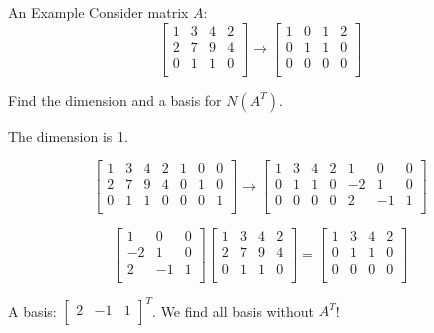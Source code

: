 \documentclass{beamer}
\begin{document}
\begin{frame}{An Example}
Consider matrix $A$:
\begin{equation*}
    \left[ \begin{matrix}
        1&		3&		4&		2\\
        2&		7&		9&		4\\
        0&		1&		1&		0\\
    \end{matrix} \right] \rightarrow \left[ \begin{matrix}
        1&		0&		1&		2\\
        0&		1&		1&		0\\
        0&		0&		0&		0\\
    \end{matrix} \right]
\end{equation*}

Find the dimension and a basis for $N(A^T)$.

\vspace{3pt}
The dimension is 1.

\begin{equation*}
    \left[ \begin{matrix}
        1&		3&		4&		2&		1&		0&		0\\
        2&		7&		9&		4&		0&		1&		0\\
        0&		1&		1&		0&		0&		0&		1\\
    \end{matrix} \right] \rightarrow \left[ \begin{matrix}
        1&		3&		4&		2&		1&		0&		0\\
        0&		1&		1&		0&		-2&		1&		0\\
        0&		0&		0&		0&		2&		-1&		1\\
    \end{matrix} \right]
\end{equation*}

\begin{equation*}
    \left[ \begin{matrix}
        1&		0&		0\\
        -2&		1&		0\\
        2&		-1&		1\\
    \end{matrix} \right] \left[ \begin{matrix}
        1&		3&		4&		2\\
        2&		7&		9&		4\\
        0&		1&		1&		0\\
    \end{matrix} \right] =\left[ \begin{matrix}
        1&		3&		4&		2\\
        0&		1&		1&		0\\
        0&		0&		0&		0\\
    \end{matrix} \right]
\end{equation*}

A basis: $\left[ \begin{matrix}
	2&		-1&		1\\
\end{matrix} \right] ^T$. We find all basis without $A^T$!

\end{frame}
\end{document}
